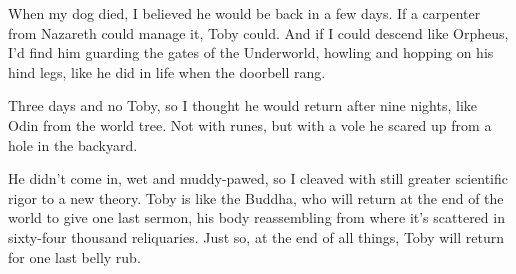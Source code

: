 When my dog died, I believed he would be back in a few days. If a
carpenter from Nazareth could manage it, Toby could. And if I could
descend like Orpheus, I'd find him guarding the gates of the Underworld,
howling and hopping on his hind legs, like he did in life when the
doorbell rang.

Three days and no Toby, so I thought he would return after nine nights,
like Odin from the world tree. Not with runes, but with a vole he scared
up from a hole in the backyard.

He didn't come in, wet and muddy-pawed, so I cleaved with still greater
scientific rigor to a new theory. Toby is like the Buddha, who will
return at the end of the world to give one last sermon, his body
reassembling from where it's scattered in sixty-four thousand
reliquaries. Just so, at the end of all things, Toby will return for one
last belly rub.
